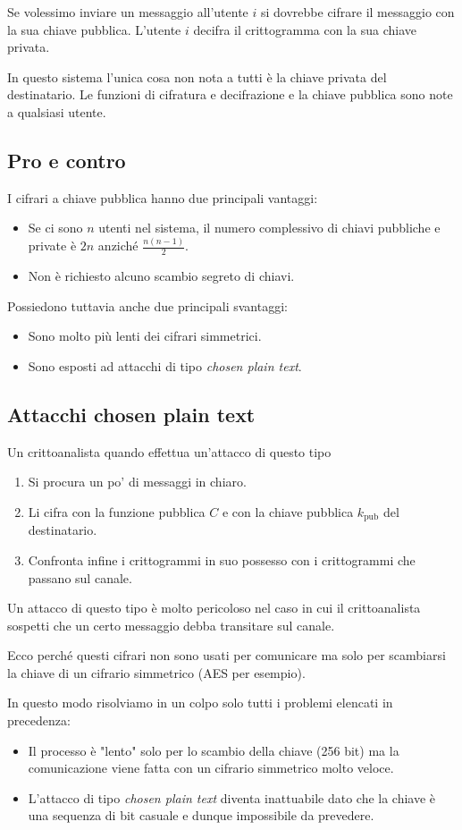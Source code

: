 Se volessimo inviare un messaggio all'utente $i$ si dovrebbe cifrare il messaggio con la sua chiave pubblica. L'utente
$i$ decifra il crittogramma con la sua chiave privata.

In questo sistema l'unica cosa non nota a tutti \`e la chiave privata del destinatario. Le funzioni di cifratura e
decifrazione e la chiave pubblica sono note a qualsiasi utente.

\subsection{Pro e contro}
I cifrari a chiave pubblica hanno due principali vantaggi:
\begin{itemize}
	\item Se ci sono $n$ utenti nel sistema, il numero complessivo di chiavi pubbliche e private \`e $2n$ anzich\'e
	      $\frac{n(n-1)}{2}$.
	\item Non \`e richiesto alcuno scambio segreto di chiavi.
\end{itemize}
Possiedono tuttavia anche due principali svantaggi:
\begin{itemize}
	\item Sono molto pi\`u lenti dei cifrari simmetrici.
	\item Sono esposti ad attacchi di tipo \emph{chosen plain text}.
\end{itemize}

\subsection{Attacchi chosen plain text}
Un crittoanalista quando effettua un'attacco di questo tipo
\begin{enumerate}
	\item Si procura un po' di messaggi in chiaro.
	\item Li cifra con la funzione pubblica $C$ e con la chiave pubblica $k_{\text{pub}}$ del destinatario.
	\item Confronta infine i crittogrammi in suo possesso con i crittogrammi che passano sul canale.
\end{enumerate}
Un attacco di questo tipo \`e molto pericoloso nel caso in cui il crittoanalista sospetti che un certo messaggio debba
transitare sul canale.

Ecco perch\'e questi cifrari non sono usati per comunicare ma solo per scambiarsi la chiave di un cifrario simmetrico
(AES per esempio).

In questo modo risolviamo in un colpo solo tutti i problemi elencati in precedenza:
\begin{itemize}
	\item Il processo \`e "lento" solo per lo scambio della chiave (256 bit) ma la comunicazione viene fatta con un
	      cifrario simmetrico molto veloce.
	\item L'attacco di tipo \emph{chosen plain text} diventa inattuabile dato che la chiave \`e una sequenza di bit
	      casuale e dunque impossibile da prevedere.
\end{itemize}


